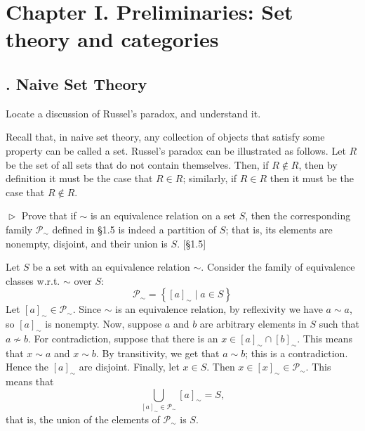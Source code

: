 \documentclass[12pt,letterpaper,boxed]{hmcpset}
\begin{document}
\newpage

\section{Chapter I.\hspace{0.2em} Preliminaries: Set theory and categories}

\subsection{. Naive Set Theory}

\begin{problem}[1.1]
	Locate a discussion of Russel's paradox, and understand it.
\end{problem}
\begin{solution}
	Recall that, in naive set theory, any collection of objects
	that satisfy some property can be called a set. Russel's paradox can be
	illustrated as follows.  Let $R$ be the set of all sets that do not contain
	themselves. Then, if $R\notin R$, then by definition it must be the case that
	$R\in R$; similarly, if $R\in R$ then it must be the case that $R\notin R$.
\end{solution}


\begin{problem}[1.2]
	$\vartriangleright$ Prove that if $\sim$ is an equivalence relation on a set $S$, then
	the corresponding family $\mathscr{P}_{\sim}$ defined in \S1.5 is indeed a
	partition of $S$; that is, its elements are nonempty, disjoint, and their union
	is $S$. [\S1.5]
\end{problem}

\begin{solution}
	Let $S$ be a set with an equivalence relation $\sim$.
	Consider the family of equivalence classes w.r.t. $\sim$ over $S$:
	\[ 
	\mathscr{P}_{\sim} = \left\{[a]_{\sim} \mid a\in S\right\} 
	\]
	Let $[a]_{\sim}\in\mathscr{P}_{\sim}$. Since $\sim$ is an equivalence relation,
	by reflexivity we have $a\sim a$, so $[a]_{\sim}$ is nonempty. Now, suppose
	$a$ and $b$ are arbitrary elements in $S$ such that $a\not\sim b$. For
	contradiction, suppose that there is an $x\in [a]_{\sim}\cap[b]_{\sim}$. This
	means that $x\sim a$ and $x\sim b$. By transitivity, we get that $a\sim b$; this
	is a contradiction. Hence the $[a]_{\sim}$ are disjoint. Finally, let $x\in S$.
	Then $x\in[x]_{\sim}\in \mathscr{P}_{\sim}$. This means that
	\[ \bigcup_{[a]_{\sim} \in \mathscr{P}_{\sim}} [a]_{\sim} = S, \]
	that is, the union of the elements of $\mathscr{P}_{\sim}$ is $S$.
\end{solution}
\end{document}
